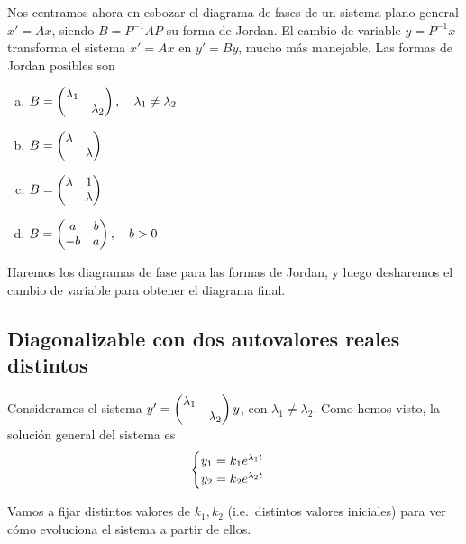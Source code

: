 \documentclass[../ecuaciones_diferenciales.tex]{subfiles}
\begin{document}
Nos centramos ahora en esbozar el diagrama de fases de un sistema plano general
\(x' = Ax\), siendo \(B = P^{-1}AP\) su forma de Jordan. El cambio de variable
\(y = P^{-1}x\) transforma el sistema \(x' = Ax\) en \(y' = By\), mucho más
manejable. Las formas de Jordan posibles son

\begin{multicols}{2}
\begin{enumerate}[(a)]
	\item \(B = \begin{pmatrix}\lambda_1 & \\ & \lambda_2\end{pmatrix}, 
		\quad \lambda_1 \neq \lambda_2\)

	\item \(B = \begin{pmatrix}\lambda & \\ & \lambda\end{pmatrix}\)

	\item \(B = \begin{pmatrix}\lambda & 1 \\ & \lambda\end{pmatrix}\)

	\item \(B = \begin{pmatrix}a & b \\ -b & a\end{pmatrix}, \quad b > 0\)
\end{enumerate}
\end{multicols}

Haremos los diagramas de fase para las formas de Jordan, y luego desharemos el
cambio de variable para obtener el diagrama final.

\subsection{Diagonalizable con dos autovalores reales distintos}

Consideramos el sistema \(y' = \begin{pmatrix}\lambda_1 & \\ & \lambda_2\end{pmatrix} y\), con
\(\lambda_1 \neq \lambda_2\). Como hemos visto, la solución general del sistema
es
\[\begin{cases}
	y_1 = k_1e^{\lambda_1 t} \\
	y_2 = k_2e^{\lambda_2 t}\end{cases}\]

Vamos a fijar distintos valores de \(k_1,k_2\) (i.e.\ distintos valores
iniciales) para ver cómo evoluciona el sistema a partir de ellos.
\end{document}
